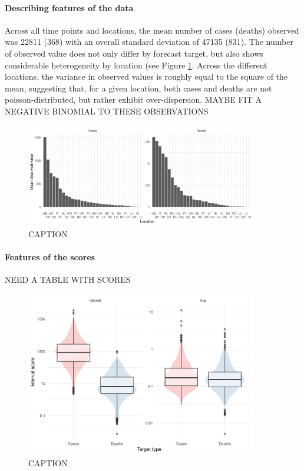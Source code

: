 \documentclass{article}
\begin{document}
\paragraph{Describing features of the data}
Across all time points and locations, the mean number of cases (deaths) observed was 22811 (368) with an overall standard deviation of 47135 (831). The number of observed value does not only differ by forecast target, but also shows considerable heterogeneity by location (see Figure \ref{fig:HUB-mean-locations}. Across the different locations, the variance in observed values is roughly equal to the square of the mean, suggesting that, for a given location, both cases and deaths are not poisson-distributed, but rather exhibit over-dispersion. 
MAYBE FIT A NEGATIVE BINOMIAL TO THESE OBSERVATIONS

\begin{figure}[h!]
    \centering
    \includegraphics[width=0.9\textwidth]{output/figures/HUB-mean-obs-location.png}
    \caption{CAPTION}
    \label{fig:HUB-mean-locations}
\end{figure}

\paragraph{Features of the scores}


NEED A TABLE WITH SCORES

\begin{figure}[h!]
    \centering
    \includegraphics[width=0.9\textwidth]{output/figures/HUB-average-scores.png}
    \caption{CAPTION}
    \label{fig:HUB-average-scores}
\end{figure}
\end{document}
